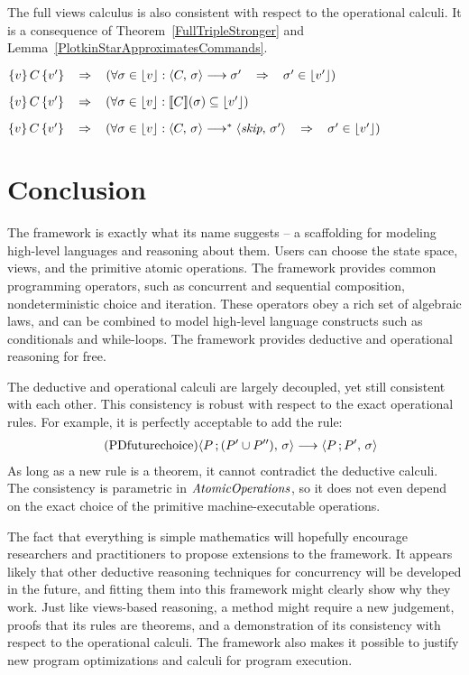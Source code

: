 \documentclass[a4paper,leqno]{llncs}
\newcommand{\mybox}[1]{\ensuremath{\text{\mbox{\ensuremath{#1}}}}}
\newcommand{\spacedwith}[2]{\ensuremath{\phantom{#2}#1\phantom{#2}}}
\newcommand{\spaced}[1]{\spacedwith{#1}{m}}
\newcommand{\primed}[1]{\ensuremath{#1^{\prime}}}
\newcommand{\askip}{\ensuremath{\textit{skip}}}
\newcommand{\asemicolon}{\ensuremath{\,;}}
\newcommand{\aor}{\ensuremath{\cup}}
\newcommand{\config}[2]{\mybox{\langle {#1},\,{#2} \rangle}}
\newcommand{\plotkin}[4]{\mybox{\config{#1}{#2}\longrightarrow\config{#3}{#4}}}
\newcommand{\plotkinstar}[4]{\mybox{\config{#1}{#2}\longrightarrow^*\config{#3}{#4}}}
\newcommand{\kahn}[3]{\mybox{\config{#1}{#2}\longrightarrow{#3}}}
\newcommand{\vtriple}[3]{\mybox{\{{#1}\}\spacedwith{#2}{\,}\{{#3}\}}}
\newcommand{\sembrack}[1]{\ensuremath{[\![#1]\!]}}
\newcommand{\AtomicOperations}{\mybox{\mathit{AtomicOperations}}}
\newcommand{\s}{\ensuremath{\sigma}}
\newcommand{\sprime}{\primed{\sigma}}
\newcommand{\view}{\ensuremath{v}}
\newcommand{\vprime}{\primed{v}}
\newcommand{\erase}[1]{\ensuremath{\lfloor{#1}\rfloor}}
\newcommand{\simplies}{\spaced{\Rightarrow}}
\newcommand{\rulename}[1]{\tag{#1}\label{#1}}
\begin{document}
The full views calculus is also consistent with respect to the operational calculi. It is a consequence of Theorem~\ref{FullTripleStronger} and Lemma~\ref{PlotkinStarApproximatesCommands}.
\begin{corollary}
$\vtriple{\view}{C}{\vprime} \simplies (\forall \s \in \erase{\view} : \kahn{C}{\s}{\sprime} \simplies \sprime \in \erase{\vprime})$
\end{corollary}
\begin{corollary}
$\vtriple{\view}{C}{\vprime} \simplies (\forall \s \in \erase{\view} : \sembrack{C}(\s)  \subseteq \erase{\vprime})$
\end{corollary}
\begin{corollary}
$\vtriple{\view}{C}{\vprime} \simplies (\forall \s \in \erase{\view} : \plotkinstar{C}{\s}{\askip}{\sprime} \simplies \sprime \in \erase{\vprime})$
\end{corollary}


\section{Conclusion}\label{Conclusion}
The framework is exactly what its name suggests -- a scaffolding for modeling high-level languages and reasoning about them. Users can choose the state space, views, and the primitive atomic operations. The framework provides common programming operators, such as concurrent and sequential composition, nondeterministic choice and iteration. These operators obey a rich set of algebraic laws, and can be combined to model high-level language constructs such as conditionals and while-loops. The framework provides deductive and operational reasoning for free.

The deductive and operational calculi are largely decoupled, yet still consistent with each other. This consistency is robust with respect to the exact operational rules. For example, it is perfectly acceptable to add the rule:
\begin{align}
&\rulename{PDfuturechoice} \plotkin{P \asemicolon (P^\prime \aor P^{\prime\prime})}{\s}{P \asemicolon P^\prime}{\s}
\end{align}
As long as a new rule is a theorem, it cannot contradict the deductive calculi. The consistency is parametric in \AtomicOperations, so it does not even depend on the exact choice of the primitive machine-executable operations.

The fact that everything is simple mathematics will hopefully encourage researchers and practitioners to propose extensions to the framework. It appears likely that other deductive reasoning techniques for concurrency will be developed in the future, and fitting them into this framework might clearly show why they work. Just like views-based reasoning, a method might require a new judgement, proofs that its rules are theorems, and a demonstration of its consistency with respect to the operational calculi. The framework also makes it possible to justify new program optimizations and calculi for program execution.
\end{document}
